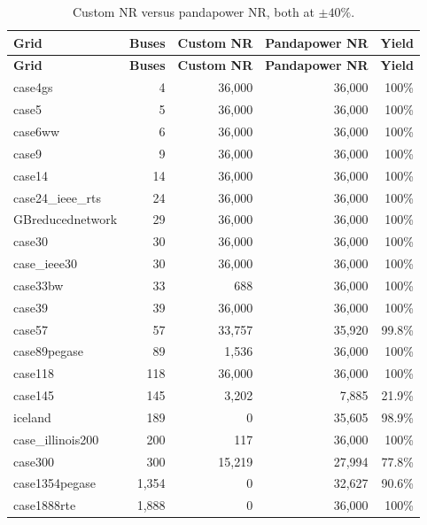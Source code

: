 \documentclass{article}
\newcommand{\cok}[1]{\textcolor{good}{#1}}
\newcommand{\cwarn}[1]{\textcolor{warn}{#1}}
\newcommand{\cbad}[1]{\textcolor{bad}{#1}}
\begin{document}
\begin{longtable}{l r r r r}
\caption{Custom NR versus pandapower NR, both at $\pm40\%$.}
\label{tab:compare}\\
\toprule
\textbf{Grid} & \textbf{Buses} & \textbf{Custom NR} & \textbf{Pandapower NR} & \textbf{Yield} \\
\midrule
\endfirsthead
\toprule
\textbf{Grid} & \textbf{Buses} & \textbf{Custom NR} & \textbf{Pandapower NR} & \textbf{Yield} \\
\midrule
\endhead
case4gs           & 4       & 36{,}000 & \cok{36{,}000} & 100\% \\
case5             & 5       & 36{,}000 & \cok{36{,}000} & 100\% \\
case6ww           & 6       & 36{,}000 & \cok{36{,}000} & 100\% \\
case9             & 9       & 36{,}000 & \cok{36{,}000} & 100\% \\
case14            & 14      & 36{,}000 & \cok{36{,}000} & 100\% \\
case24\_ieee\_rts & 24      & 36{,}000 & \cok{36{,}000} & 100\% \\
GBreducednetwork  & 29      & 36{,}000 & \cok{36{,}000} & 100\% \\
case30            & 30      & 36{,}000 & \cok{36{,}000} & 100\% \\
case\_ieee30      & 30      & 36{,}000 & \cok{36{,}000} & 100\% \\
case33bw          & 33      & \cbad{688} & \cok{36{,}000} & 100\% \\
case39            & 39      & 36{,}000 & \cok{36{,}000} & 100\% \\
case57            & 57      & 33{,}757 & \cok{35{,}920} & 99.8\% \\
case89pegase      & 89      & \cbad{1{,}536} & \cok{36{,}000} & 100\% \\
case118           & 118     & 36{,}000 & \cok{36{,}000} & 100\% \\
case145           & 145     & \cbad{3{,}202} & \cbad{7{,}885} & \cbad{21.9\%} \\
iceland           & 189     & \cbad{0}   & \cok{35{,}605} & 98.9\% \\
case\_illinois200 & 200     & \cbad{117} & \cok{36{,}000} & 100\% \\
case300           & 300     & 15{,}219 & \cwarn{27{,}994} & 77.8\% \\
case1354pegase    & 1{,}354 & \cbad{0}   & \cok{32{,}627} & 90.6\% \\
case1888rte       & 1{,}888 & \cbad{0}   & \cok{36{,}000} & 100\% \\

\end{longtable}
\end{document}
